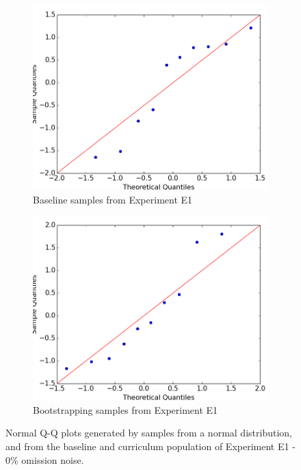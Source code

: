 \begin{figure}
\begin{subfigure}{0.38\textwidth}
\includegraphics[width=\linewidth]{figs/normality/10samples_baseline2.png}
\caption{Baseline samples from Experiment E1} \label{fig:normality_baseline}
\end{subfigure}
\hspace*{\fill} %
\begin{subfigure}{0.38\textwidth}
\includegraphics[width=\linewidth]{figs/normality/10samples_bootstrapping2.png}
\caption{Bootstrapping samples from Experiment E1} \label{fig:normality_bootstrapping}
\end{subfigure}
\caption[Normal Q-Q plot example]{Normal Q-Q plots generated by samples from a normal distribution, and from the baseline and curriculum population of Experiment E1 - 0\% omission noise. } \label{fig:normalityqq}
\end{figure}


